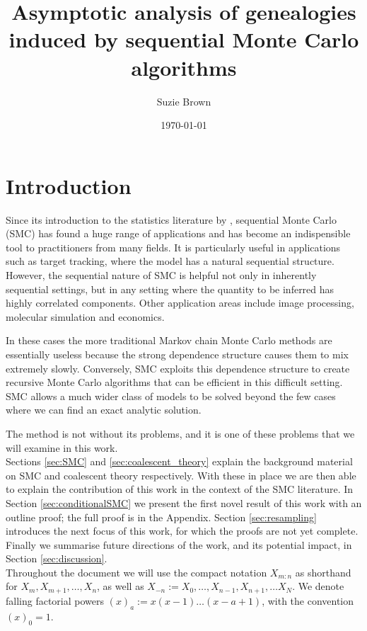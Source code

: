 \documentclass[fleqn]{article}
\title{Asymptotic analysis of genealogies induced by sequential Monte Carlo algorithms}
\author{Suzie Brown}
\date{\today}
\theoremstyle{definition}
\begin{document}
\maketitle
\thispagestyle{fancy}

\section{Introduction}
Since its introduction to the statistics literature by \citet{gordon1993}, sequential Monte Carlo (SMC) has found a huge range of applications and has become an indispensible tool to practitioners from many fields. 
It is particularly useful in applications such as target tracking, where the model has a natural sequential structure.
However, the sequential nature of SMC is helpful not only in inherently sequential settings, but in any setting where the quantity to be inferred has highly correlated components.
Other application areas include image processing, molecular simulation and economics.

In these cases the more traditional Markov chain Monte Carlo methods are essentially useless because the strong dependence structure causes them to mix extremely slowly.
Conversely, SMC exploits this dependence structure to create recursive Monte Carlo algorithms that can be efficient in this difficult setting.
SMC allows a much wider class of models to be solved beyond the few cases where we can find an exact analytic solution.

The method is not without its problems, and it is one of these problems that we will examine in this work.\\

Sections \ref{sec:SMC} and \ref{sec:coalescent_theory} explain the background material on SMC and coalescent theory respectively. With these in place we are then able to explain the contribution of this work in the context of the SMC literature.
In Section \ref{sec:conditionalSMC} we present the first novel result of this work with an outline proof; the full proof is in the Appendix.
Section \ref{sec:resampling} introduces the next focus of this work, for which the proofs are not yet complete.
Finally we summarise future directions of the work, and its potential impact, in Section \ref{sec:discussion}.\\

Throughout the document we will use the compact notation $X_{m:n}$ as shorthand for $X_m, X_{m+1}, \dots, X_n$, as well as $X_{-n} := X_0, \dots, X_{n-1}, X_{n+1}, \dots X_{N}$.
We denote falling factorial powers $(x)_a := x(x-1)\dots(x-a+1)$, with the convention $(x)_0 = 1$.
\end{document}
